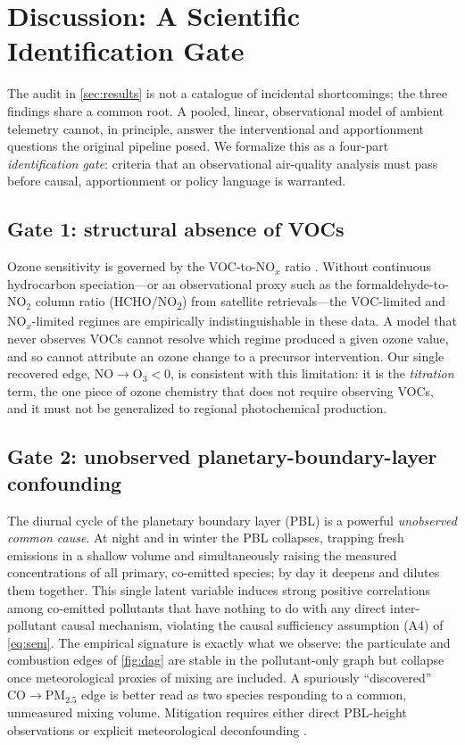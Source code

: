 \section{Discussion: A Scientific Identification Gate}
\label{sec:gate}

The audit in \cref{sec:results} is not a catalogue of incidental shortcomings; the
three findings share a common root. A pooled, linear, observational model of ambient
telemetry cannot, in principle, answer the interventional and apportionment questions
the original pipeline posed. We formalize this as a four-part \emph{identification
gate}: criteria that an observational air-quality analysis must pass before causal,
apportionment or policy language is warranted.

\subsection{Gate 1: structural absence of VOCs}
Ozone sensitivity is governed by the VOC-to-NO$_x$ ratio
\citep{sillman1999,monks2015ozone,seinfeld2016atmospheric}. Without continuous
hydrocarbon speciation---or an observational proxy such as the formaldehyde-to-NO$_2$
column ratio (HCHO/NO\textsubscript{2}) from satellite retrievals---the VOC-limited and
NO$_x$-limited regimes are empirically indistinguishable in these data. A model that
never observes VOCs cannot resolve which regime produced a given ozone value, and so
cannot attribute an ozone change to a precursor intervention. Our single recovered
edge, $\mathrm{NO}\rightarrow\mathrm{O_3}<0$, is consistent with this limitation: it is
the \emph{titration} term, the one piece of ozone chemistry that does not require
observing VOCs, and it must not be generalized to regional photochemical production.

\subsection{Gate 2: unobserved planetary-boundary-layer confounding}
The diurnal cycle of the planetary boundary layer (PBL) is a powerful \emph{unobserved
common cause}. At night and in winter the PBL collapses, trapping fresh emissions in a
shallow volume and simultaneously raising the measured concentrations of all primary,
co-emitted species; by day it deepens and dilutes them together. This single latent
variable induces strong positive correlations among co-emitted pollutants that have
nothing to do with any direct inter-pollutant causal mechanism, violating the causal
sufficiency assumption (A4) of \eqref{eq:sem}. The empirical signature is exactly what
we observe: the particulate and combustion edges of \cref{fig:dag} are stable in the
pollutant-only graph but collapse once meteorological proxies of mixing are included.
A spuriously ``discovered'' $\mathrm{CO}\rightarrow\mathrm{PM_{2.5}}$ edge is better read
as two species responding to a common, unmeasured mixing volume. Mitigation requires
either direct PBL-height observations or explicit meteorological deconfounding
\citep{grange2019metnorm,grange2018rf,chernozhukov2018double}.

